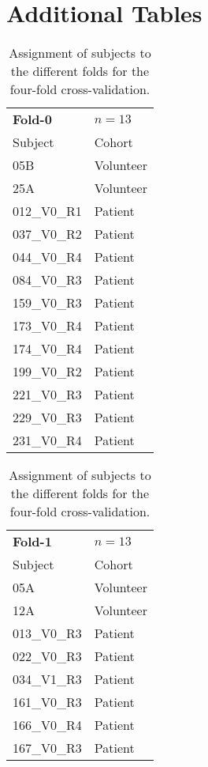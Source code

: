 \chapter{Additional Tables} %

\begin{table}[htbp]
   \centering
   \caption{Assignment of subjects to the different folds for the four-fold cross-validation.}
   \begin{tabular}{p{3cm}l}
      \toprule
      \textbf{Fold-0} & $n = 13$ \\      
      Subject & Cohort \\
      \midrule
      05B           & Volunteer \\
      25A           & Volunteer \\
      012\_V0\_R1  & Patient   \\
      037\_V0\_R2  & Patient   \\
      044\_V0\_R4  & Patient   \\
      084\_V0\_R3  & Patient   \\
      159\_V0\_R3 & Patient   \\
      173\_V0\_R4 & Patient   \\
      174\_V0\_R4 & Patient   \\
      199\_V0\_R2 & Patient   \\
      221\_V0\_R3 & Patient   \\
      229\_V0\_R3 & Patient   \\
      231\_V0\_R4 & Patient   \\
      \bottomrule
   \end{tabular}
   \begin{tabular}{p{3cm}l}      
      \toprule
      \textbf{Fold-1} & $n = 13$ \\
      Subject & Cohort \\
      \midrule
      05A           & Volunteer \\
      12A           & Volunteer \\
      013\_V0\_R3  & Patient   \\
      022\_V0\_R3  & Patient   \\
      034\_V1\_R3  & Patient   \\
      161\_V0\_R3 & Patient   \\
      166\_V0\_R4 & Patient   \\
      167\_V0\_R3 & Patient   \\

\end{tabular}
\end{table}
